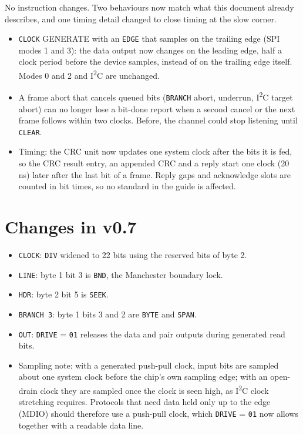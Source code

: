 \documentclass[11pt,a4paper]{article}
\newcommand{\sig}[1]{\texttt{#1}}
\begin{document}
No instruction changes. Two behaviours now match what this document already describes, and one timing detail changed to close timing at the slow corner.
\begin{itemize}
\item \sig{CLOCK} GENERATE with an \sig{EDGE} that samples on the trailing edge (SPI modes 1 and 3): the data output now changes on the leading edge, half a clock period before the device samples, instead of on the trailing edge itself. Modes 0 and 2 and I\textsuperscript{2}C are unchanged.
\item A frame abort that cancels queued bits (\sig{BRANCH} abort, underrun, I\textsuperscript{2}C target abort) can no longer lose a bit-done report when a second cancel or the next frame follows within two clocks. Before, the channel could stop listening until \sig{CLEAR}.
\item Timing: the CRC unit now updates one system clock after the bits it is fed, so the CRC result entry, an appended CRC and a reply start one clock (20\,ns) later after the last bit of a frame. Reply gaps and acknowledge slots are counted in bit times, so no standard in the guide is affected.
\end{itemize}

\section{Changes in v0.7}

\begin{itemize}
\item \sig{CLOCK}: \sig{DIV} widened to 22 bits using the reserved bits of byte 2.
\item \sig{LINE}: byte 1 bit 3 is \sig{BND}, the Manchester boundary lock.
\item \sig{HDR}: byte 2 bit 5 is \sig{SEEK}.
\item \sig{BRANCH 3}: byte 1 bits 3 and 2 are \sig{BYTE} and \sig{SPAN}.
\item \sig{OUT}: \sig{DRIVE} = \texttt{01} releases the data and pair outputs during generated read bits.
\item Sampling note: with a generated push-pull clock, input bits are sampled about one system clock before the chip's own sampling edge; with an open-drain clock they are sampled once the clock is seen high, as I\textsuperscript{2}C clock stretching requires. Protocols that need data held only up to the edge (MDIO) should therefore use a push-pull clock, which \sig{DRIVE} = \texttt{01} now allows together with a readable data line.
\end{itemize}
\end{document}
